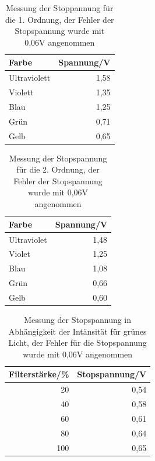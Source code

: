 \documentclass[12px]{scrartcl}
\begin{document}
\begin{table}[H]
\caption{Messung der Stoppannung für die 1. Ordnung, der Fehler der Stopspannung wurde mit 0,06V angenommen}
\begin{center}
\begin{tabular}{|l|r|}
\hline
Farbe & \multicolumn{1}{l|}{Spannung/V} \\ \hline
Ultraviolett & 1,58 \\ \hline
Violett & 1,35 \\ \hline
Blau & 1,25 \\ \hline
Grün & 0,71 \\ \hline
Gelb & 0,65 \\ \hline
\end{tabular}
\end{center}
\label{tab:a_1_1}
\end{table}

\begin{table}[H]
\caption{Messung der Stopspannung für die 2. Ordnung, der Fehler der Stopspannung wurde mit 0,06V angenommen}
\begin{center}
\begin{tabular}{|l|r|}
\hline
Farbe & \multicolumn{1}{l|}{Spannung/V} \\ \hline
Ultraviolet & 1,48 \\ \hline
Violet  & 1,25 \\ \hline
Blau & 1,08 \\ \hline
Grün & 0,66 \\ \hline
Gelb & 0,60 \\ \hline
\end{tabular}
\end{center}
\label{tab:a_1_2}
\end{table}

\begin{table}[H]
\caption{Messung der Stopspannung in Abhängigkeit der Intänsität für grünes Licht, der Fehler für die Stopspannung wurde mit 0,06V angenommen}
\begin{center}
\begin{tabular}{|r|r|}
\hline
\multicolumn{1}{|l|}{Filterstärke/\%} & \multicolumn{1}{l|}{Stopspannung/V} \\ \hline
20 & 0,54 \\ \hline
40 & 0,58 \\ \hline
60 & 0,61 \\ \hline
80 & 0,64 \\ \hline
100 & 0,65 \\ \hline
\end{tabular}
\end{center}
\label{tab:intänsität}
\end{table}
\end{document}
